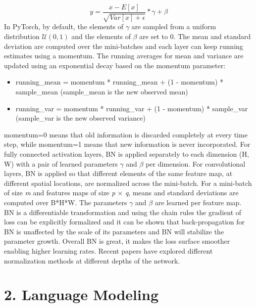 \documentclass[11pt]{article}
\newcommand{\0}{\mat{0}}
\begin{document}
\begin{itemize}
    	\[
    		y =\frac{x-E[x]} {\sqrt{Var[x]+\epsilon}} * \gamma + \beta
    	\]
	In PyTorch,  by default, the elements of $\gamma$ are sampled from a uniform distribution $\mathcal{U}(0,1)$ and the elements of $\beta$ are set to 0. The mean and standard deviation are computed over the mini-batches and each layer can keep running estimates using a momentum. The running averages for mean and variance are updated using an exponential decay based on the momentum parameter:
	\begin{itemize}
    		\item running\_mean = momentum * running\_mean + (1 - momentum) * sample\_mean (sample\_mean is the new observed mean)
    		\item running\_var = momentum * running\_var + (1 - momentum) * sample\_var (sample\_var is the new observed variance)
    	\end{itemize}   
	momentum=0 means that old information is discarded completely at every time step, while momentum=1 means that new information is never incorporated. For fully connected activation layers, BN is applied separately to each dimension (H, W) with a pair of learned parameters $\gamma$ and $\beta$ per dimension. For convolutional layers, BN is applied so that different elements of the same feature map, at different spatial locations, are normalized across the mini-batch. For a mini-batch of size \textit{m} and features maps of size \textit{p} $\times$ \textit{q}, means and standard deviations are computed over B*H*W. The parameters $\gamma$ and $\beta$ are learned per feature map. BN is a differentiable transformation and using the chain rules the gradient of loss can be explicitly formalized and it can be shown that back-propagation for BN is unaffected by the scale of its parameters and BN will stabilize the parameter growth. Overall BN is great, it makes the loss surface smoother enabling higher learning rates. Recent papers have explored different normalization methods at different depths of the network.
 \end{itemize}   
 
 \section*{2. Language Modeling}
 
\end{document}
